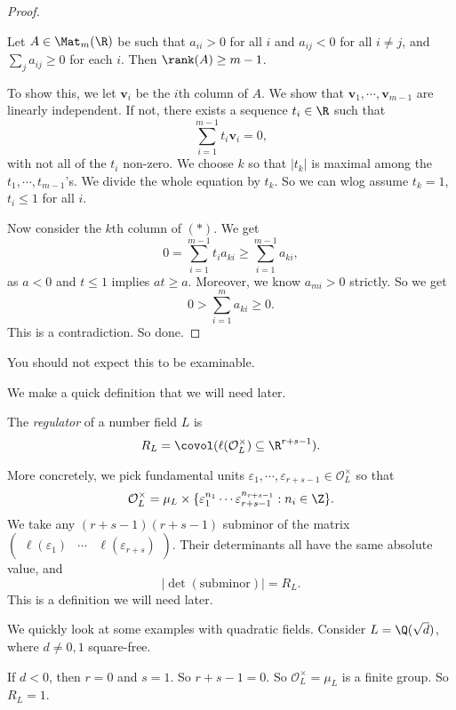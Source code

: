 \documentclass[a4paper]{article}
\begin{document}
\begin{proof}
  \begin{claim}
    Let $A \in \Mat_{m}(\R)$ be such that $a_{ii} > 0$ for all $i$ and $a_{ij} < 0$ for all $i\not= j$, and $\sum_j a_{ij} \geq 0$ for each $i$. Then $\rank(A) \geq m - 1$.
  \end{claim}

  To show this, we let $\mathbf{v}_i$ be the $i$th column of $A$. We show that $\mathbf{v}_1, \cdots, \mathbf{v}_{m - 1}$ are linearly independent. If not, there exists a sequence $t_i \in \R$ such that
  \[
    \sum_{i = 1}^{m - 1} t_i \mathbf{v}_i = 0,\tag{$*$}
  \]
  with not all of the $t_i$ non-zero. We choose $k$ so that $|t_k|$ is maximal among the $t_1, \cdots, t_{m - 1}$'s. We divide the whole equation by $t_k$. So we can wlog assume $t_k = 1$, $t_i \leq 1$ for all $i$.

  Now consider the $k$th column of $(*)$. We get
  \[
    0 = \sum_{i = 1}^{m - 1} t_i a_{ki} \geq \sum_{i = 1}^{m - 1} a_{ki},
  \]
  as $a < 0$ and $t \leq 1$ implies $at \geq a$. Moreover, we know $a_{mi} > 0$ strictly. So we get
  \[
    0 > \sum_{i = 1}^m a_{ki} \geq 0.
  \]
  This is a contradiction. So done.
\end{proof}
You should not expect this to be examinable.

We make a quick definition that we will need later.
\begin{defi}[Regulator]
  The \emph{regulator} of a number field $L$ is
  \[
    R_L = \covol (\ell(\mathcal{O}_L^\times) \subseteq \R^{r + s - 1}).
  \]
\end{defi}
More concretely, we pick fundamental units $\varepsilon_1, \cdots, \varepsilon_{r + s - 1} \in \mathcal{O}_L^\times$ so that
\[
  \mathcal{O}_L^\times = \mu_L \times \{\varepsilon_1^{n_1} \cdots \varepsilon_{r + s - 1}^{n_{r + s - 1}} : n_i \in \Z\}.
\]
We take any $(r + s - 1)(r + s - 1)$ subminor of the matrix $\begin{pmatrix} \ell(\varepsilon_1) & \cdots & \ell(\varepsilon_{r + s})\end{pmatrix}$. Their determinants all have the same absolute value, and
\[
  |\det(\text{subminor})| = R_L.
\]
This is a definition we will need later.

We quickly look at some examples with quadratic fields. Consider $L = \Q(\sqrt{d})$, where $d \not= 0, 1$ square-free.
\begin{eg}
  If $d < 0$, then $r = 0$ and $s = 1$. So $r + s - 1 = 0$. So $\mathcal{O}_L^\times = \mu_L$ is a finite group. So $R_L = 1$.
\end{eg}
\end{document}
